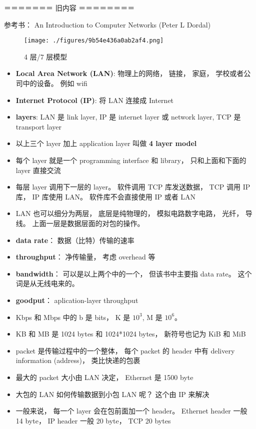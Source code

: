 ＝＝＝＝＝＝＝ 旧内容 ＝＝＝＝＝＝＝＝

参考书： An Introduction to Computer Networks (Peter L Dordal)

\begin{figure}[ht]
\centering
\texttt{[image: ./figures/9b54e436a0ab2af4.png]}
\caption{4 层/7 层模型} \label{fig_NetNt_1}
\end{figure}

\begin{itemize}
\item \textbf{Local Area Network (LAN)}: 物理上的网络， 链接， 家庭， 学校或者公司中的设备。 例如 wifi
\item \textbf{Internet Protocol (IP)}: 将 LAN 连接成 Internet
\item \textbf{layers}: LAN 是 link layer, IP 是 internet layer 或 network layer, TCP 是 transport layer
\item 以上三个 layer 加上 application layer 叫做 \textbf{4 layer model}
\item 每个 layer 就是一个 programming interface 和 library， 只和上面和下面的 layer 直接交流
\item 每层 layer 调用下一层的 layer。 软件调用 TCP 库发送数据， TCP 调用 IP 库， IP 库使用 LAN。 软件库不会直接使用 IP 或者 LAN
\item LAN 也可以细分为两层， 底层是纯物理的， 模拟电路数字电路， 光纤， 导线。 上面一层是数据层面的对包的操作。
\item \textbf{data rate}： 数据（比特）传输的速率
\item \textbf{throughput}： 净传输量， 考虑 overhead 等
\item \textbf{bandwidth}： 可以是以上两个中的一个， 但该书中主要指 data rate。 这个词是从无线电来的。
\item \textbf{goodput}： aplication-layer throughput
\item Kbps 和 Mbps 中的 b 是 bits， K 是 $10^3$, M 是 $10^6$。
\item KB 和 MB 是 1024 bytes 和 1024*1024 bytes， 新符号也记为 KiB 和 MiB
\item packet 是传输过程中的一个整体， 每个 packet 的 header 中有 delivery information (address)， 类比快递的包裹
\item 最大的 packet 大小由 LAN 决定， Ethernet 是 1500 byte
\item 大包的 LAN 如何传输数据到小包 LAN 呢？ 这个由 IP 来解决
\item 一般来说， 每一个 layer 会在包前面加一个 header。 Ethernet header 一般 14 byte， IP header 一般 20 byte， TCP 20 bytes
\end{itemize}

